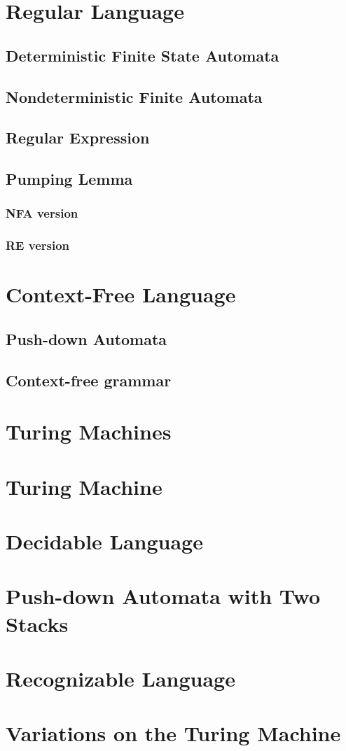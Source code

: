 \documentclass{report}
\begin{document}
	\section{Regular Language}
		\subsection{Deterministic Finite State Automata}
		
		\subsection{Nondeterministic Finite Automata}
		
		\subsection{Regular Expression}
		
		\subsection{Pumping Lemma}
			\subsubsection{NFA version}
			
			\subsubsection{RE version}
	
	\section{Context-Free Language}
		\subsection{Push-down Automata}
		
		\subsection{Context-free grammar}
	
	\section{Turing Machines}
		\section{Turing Machine}
		
		\section{Decidable Language}
		
		\section{Push-down Automata with Two Stacks}
		
		\section{Recognizable Language}
		
		\section{Variations on the Turing Machine}
		
\end{document}

